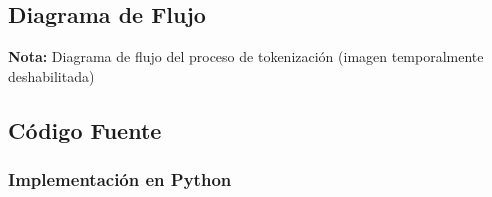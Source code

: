 \documentclass[12pt,a4paper]{article}
\begin{document}
\subsection{Diagrama de Flujo}


\textbf{Nota:} Diagrama de flujo del proceso de tokenización (imagen temporalmente deshabilitada)

\subsection{Código Fuente}

\subsubsection{Implementación en Python}
\end{document}
